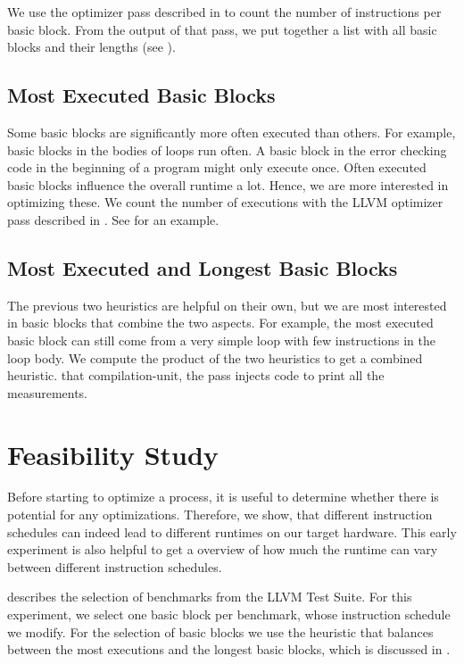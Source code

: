 We use the optimizer pass described in  to count the number of instructions per basic block.
From the output of that pass, we put together a list with all basic blocks and their lengths (see ).

\subsection{Most Executed Basic Blocks}
Some basic blocks are significantly more often executed than others.
For example, basic blocks in the bodies of loops run often.
A basic block in the error checking code in the beginning of a program might only execute once.
Often executed basic blocks influence the overall runtime a lot.
Hence, we are more interested in optimizing these.
We count the number of executions with the LLVM optimizer pass described in .
See  for an example.


\subsection{Most Executed and Longest Basic Blocks}
The previous two heuristics are helpful on their own, but we are most interested in basic blocks that combine the two aspects.
For example, the most executed basic block can still come from a very simple loop with few instructions in the loop body.
We compute the product of the two heuristics to get a combined heuristic. that compilation-unit, the pass injects code to print all the measurements.

\section{Feasibility Study}
\label{sec:eval:validation}
Before starting to optimize a process, it is useful to determine whether there is potential for any optimizations.
Therefore, we show, that different instruction schedules can indeed lead to different runtimes on our target hardware.
This early experiment is also helpful to get a overview of how much the runtime can vary between different instruction schedules.

 describes the selection of benchmarks from the LLVM Test Suite.
For this experiment, we select one basic block per benchmark, whose instruction schedule we modify.
For the selection of basic blocks we use the heuristic that balances between the most executions and the longest basic blocks, which is discussed in .

